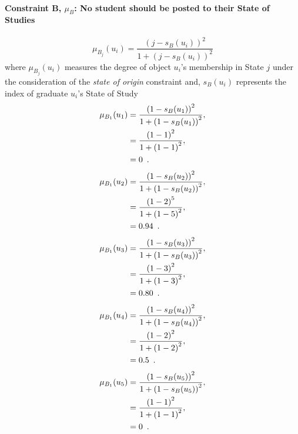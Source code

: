 \documentclass[a4paper,openany]{book}
\begin{document}
			\paragraph{Constraint B, $\mu_B$: No student should be posted to their State of Studies}
				\begin{equation}
					\mu_{B_j}(u_i) = \frac{\left(j-s_B(u_i)\right)^2}{1 + \left(j-s_B(u_i)\right)^2}
				\end{equation}
				where $\mu_{B_j}(u_i)$ measures the degree of object $u_i$'s membership in State $j$ under the consideration of the \textit{state of origin} constraint and,
				$s_B(u_i)$ represents the index of graduate $u_i$'s State of Study\\
				\begin{align}
					\mu_{B_1}(u_1) &= \frac{\left(1-s_B(u_1)\right)^2}{1 + \left(1-s_B(u_1)\right)^2} ,\\
					&= \frac{\left(1-1\right)^2}{1 + \left(1-1\right)^2} \notag ,\\
					&= 0 \enspace. \notag
				\end{align}
				\begin{align}
					\mu_{B_1}(u_2) &= \frac{\left(1-s_B(u_2)\right)^2}{1 + \left(1-s_B(u_2)\right)^2} ,\\
					&= \frac{\left(1-2\right)^5}{1 + \left(1-5\right)^2} \notag ,\\
					&= 0.94 \enspace. \notag
				\end{align}
				\begin{align}
					\mu_{B_1}(u_3) &= \frac{\left(1-s_B(u_3)\right)^2}{1 + \left(1-s_B(u_3)\right)^2} ,\\
					&= \frac{\left(1-3\right)^2}{1 + \left(1-3\right)^2} \notag ,\\
					&= 0.80 \enspace. \notag
				\end{align}
				\begin{align}
					\mu_{B_1}(u_4) &= \frac{\left(1-s_B(u_4)\right)^2}{1 + \left(1-s_B(u_4)\right)^2} ,\\
					&= \frac{\left(1-2\right)^2}{1 + \left(1-2\right)^2} \notag ,\\
					&= 0.5 \enspace. \notag
				\end{align}
				\begin{align}
					\mu_{B_1}(u_5) &= \frac{\left(1-s_B(u_5)\right)^2}{1 + \left(1-s_B(u_5)\right)^2} ,\\
					&= \frac{\left(1-1\right)^2}{1 + \left(1-1\right)^2} \notag ,\\
					&= 0 \enspace. \notag
				\end{align}
\end{document}
